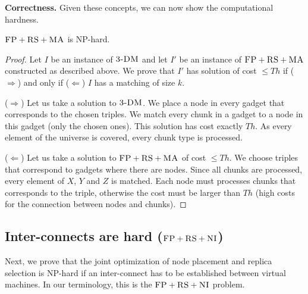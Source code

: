 \documentclass[9pt]{sigcomm-alternate}
\newcommand{\CC}{\textsc{NI}}
\newcommand{\FP}{\textsc{FP}}
\newcommand{\RS}{\textsc{RS}}
\newcommand{\MA}{\textsc{MA}}
\newcommand{\TDM}{\textsc{3-DM}}
\newcommand{\Thr}{\ensuremath{Th}}
\begin{document}
\textbf{Correctness.}
Given these concepts, we can now show the computational hardness.
\begin{theorem}
$\FP+\RS+\MA$ is NP-hard.
\end{theorem}
\begin{proof}
Let $I$ be an instance of $\TDM$ and let $I'$ be an instance of
$\FP+\RS+\MA$ constructed as described above.
We prove that $I'$ has solution of cost $\leq \Thr$ if ($\Rightarrow$) and only if
($\Leftarrow$)
$I$ has a matching of size $k$.

($\Rightarrow$) Let us take a solution to $\TDM$. We place a node in every
gadget that corresponds to the chosen triples. We match every chunk in a
gadget to a node in this gadget (only the chosen ones). This solution has
cost exactly $\Thr$. As every element of the universe is covered, every
chunk type is processed.

($\Leftarrow$) Let us take a solution to $\FP+\RS+\MA$ of cost $\leq \Thr$. We
choose triples that correspond to gadgets where there are nodes. Since
all chunks are processed, every element of $X$, $Y$ and $Z$ is matched. Each
node must processes chunks that corresponds to the triple, otherwise the
cost must be larger than $\Thr$ (high costs for the connection between
nodes and chunks).
\end{proof}


\subsection{Inter-connects are hard ($\FP+\RS+\CC$)}\label{ssec:fprscc}

Next, we prove that the joint optimization of node placement and replica selection
is NP-hard if an inter-connect has to be established between virtual machines.
In our terminology, this is the $\FP+\RS+\CC$ problem.
\end{document}
